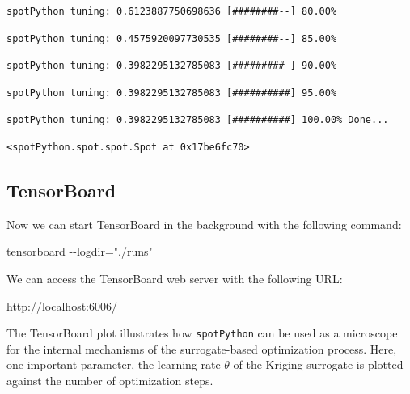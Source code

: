 \documentclass[
  letterpaper,
  DIV=11,
  numbers=noendperiod]{scrreprt}
\newenvironment{Shaded}{\begin{snugshade}}{\end{snugshade}}
\newcommand{\NormalTok}[1]{\textcolor[rgb]{0.00,0.23,0.31}{#1}}
\begin{document}
\begin{verbatim}
spotPython tuning: 0.6123887750698636 [########--] 80.00% 
\end{verbatim}

\begin{verbatim}
spotPython tuning: 0.4575920097730535 [########--] 85.00% 
\end{verbatim}

\begin{verbatim}
spotPython tuning: 0.3982295132785083 [#########-] 90.00% 
\end{verbatim}

\begin{verbatim}
spotPython tuning: 0.3982295132785083 [##########] 95.00% 
\end{verbatim}

\begin{verbatim}
spotPython tuning: 0.3982295132785083 [##########] 100.00% Done...
\end{verbatim}

\begin{verbatim}
<spotPython.spot.spot.Spot at 0x17be6fc70>
\end{verbatim}

\hypertarget{tensorboard-5}{%
\subsection{TensorBoard}\label{tensorboard-5}}

Now we can start TensorBoard in the background with the following
command:

\begin{Shaded}
\begin{Highlighting}[]
\NormalTok{tensorboard {-}{-}logdir="./runs"}
\end{Highlighting}
\end{Shaded}

We can access the TensorBoard web server with the following URL:

\begin{Shaded}
\begin{Highlighting}[]
\NormalTok{http://localhost:6006/}
\end{Highlighting}
\end{Shaded}

The TensorBoard plot illustrates how \texttt{spotPython} can be used as
a microscope for the internal mechanisms of the surrogate-based
optimization process. Here, one important parameter, the learning rate
\(\theta\) of the Kriging surrogate is plotted against the number of
optimization steps.
\end{document}

